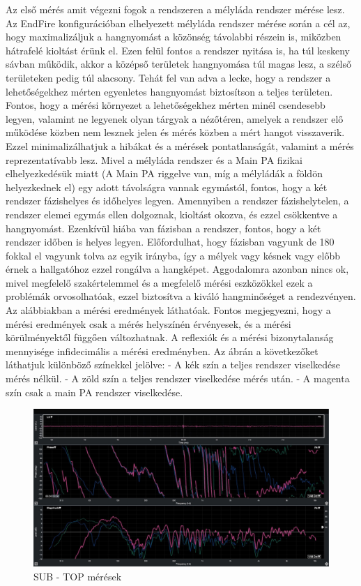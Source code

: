 Az első mérés amit végezni fogok a rendszeren a mélyláda rendszer mérése lesz.
Az EndFire konfigurációban elhelyezett mélyláda rendszer mérése során a cél az, hogy maximalizáljuk a hangnyomást a közönség távolabbi részein is,
miközben hátrafelé kioltást érünk el. Ezen felül fontos a rendszer nyitása is, ha túl keskeny sávban működik, akkor a középső területek
hangnyomása túl magas lesz, a szélső területeken pedig túl alacsony. Tehát fel van adva a lecke, hogy a rendszer a lehetőségekhez mérten
egyenletes hangnyomást biztosítson a teljes területen.
Fontos, hogy a mérési környezet a lehetőségekhez mérten minél csendesebb legyen, valamint
ne legyenek olyan tárgyak a nézőtéren, amelyek a rendszer elő működése közben
nem lesznek jelen és mérés közben a mért hangot visszaverik. Ezzel minimalizálhatjuk a
hibákat és a mérések pontatlanságát, valamint a mérés reprezentatívabb lesz.
Mivel a mélyláda rendszer és a Main PA fizikai elhelyezkedésük miatt (A Main PA riggelve van, míg a mélyládák a földön helyezkednek el)
egy adott távolságra vannak egymástól, fontos, hogy a két rendszer fázishelyes és időhelyes legyen.
Amennyiben a rendszer fázishelytelen, a rendszer elemei egymás ellen dolgoznak, kioltást okozva, és ezzel csökkentve a hangnyomást.
Ezenkívül hiába van fázisban a rendszer, fontos, hogy a két rendszer időben is helyes legyen. Előfordulhat, hogy fázisban vagyunk de 180 fokkal el vagyunk tolva
az egyik irányba, így a mélyek vagy késnek vagy előbb érnek a hallgatóhoz ezzel rongálva a hangképet.
Aggodalomra azonban nincs ok, mivel megfelelő szakértelemmel és a megfelelő mérési eszközökkel ezek a problémák orvosolhatóak, ezzel biztosítva
a kiváló hangminőséget a rendezvényen.
Az alábbiakban a mérési eredmények láthatóak.
Fontos megjegyezni, hogy a mérési eredmények csak a mérés helyszínén érvényesek, és a mérési körülményektől függően változhatnak.
A reflexiók és a mérési bizonytalanság mennyisége infidecimális a mérési eredményben.
Az ábrán a következőket láthatjuk különböző színekkel jelölve:
- A kék szín a teljes rendszer viselkedése mérés nélkül.
- A zöld szín a teljes rendszer viselkedése mérés után.
- A magenta szín csak a main PA rendszer viselkedése.
\begin{figure}[H]
	\centering
	\includegraphics[width=\textwidth, keepaspectratio]{figures/smaart_sub_top.jpg}
	\caption{SUB - TOP mérések}\label{fig:smaart_sub_top}
\end{figure}
